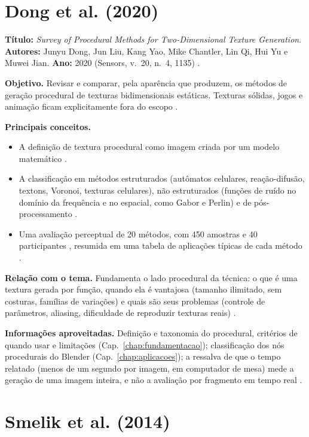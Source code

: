\section{Dong et al. (2020)}

\textbf{Título:} \textit{Survey of Procedural Methods for Two-Dimensional Texture Generation}. \textbf{Autores:} Junyu Dong, Jun Liu, Kang Yao, Mike Chantler, Lin Qi, Hui Yu e Muwei Jian. \textbf{Ano:} 2020 (Sensors, v.~20, n.~4, 1135) \cite{dong2020}.

\textbf{Objetivo.} Revisar e comparar, pela aparência que produzem, os métodos de geração procedural de texturas bidimensionais estáticas. Texturas sólidas, jogos e animação ficam explicitamente fora do escopo \cite[p.~2]{dong2020}.

\textbf{Principais conceitos.}
\begin{itemize}
    \item A definição de textura procedural como imagem criada por um modelo matemático \cite[p.~1]{dong2020}.
    \item A classificação em métodos estruturados (autômatos celulares, reação-difusão, textons, Voronoi, texturas celulares), não estruturados (funções de ruído no domínio da frequência e no espacial, como Gabor e Perlin) e de pós-processamento \cite[pp.~3--4]{dong2020}.
    \item Uma avaliação perceptual de 20 métodos, com 450 amostras e 40 participantes \cite[pp.~19--20]{dong2020}, resumida em uma tabela de aplicações típicas de cada método \cite[p.~22]{dong2020}.
\end{itemize}

\textbf{Relação com o tema.} Fundamenta o lado procedural da técnica: o que é uma textura gerada por função, quando ela é vantajosa (tamanho ilimitado, sem costuras, famílias de variações) e quais são seus problemas (controle de parâmetros, aliasing, dificuldade de reproduzir texturas reais) \cite[pp.~2, 13, 23]{dong2020}.

\textbf{Informações aproveitadas.} Definição e taxonomia do procedural, critérios de quando usar e limitações (Cap.~\ref{chap:fundamentacao}); classificação dos nós procedurais do Blender (Cap.~\ref{chap:aplicacoes}); a ressalva de que o tempo relatado (menos de um segundo por imagem, em computador de mesa) mede a geração de uma imagem inteira, e não a avaliação por fragmento em tempo real \cite[p.~21]{dong2020}.

\section{Smelik et al. (2014)}

